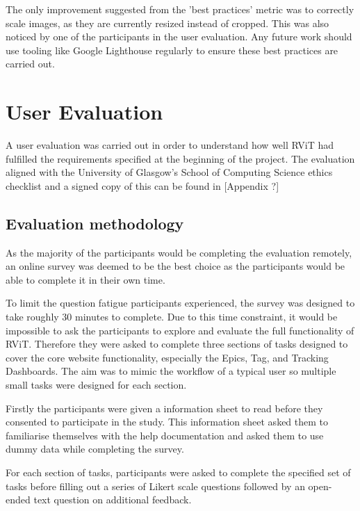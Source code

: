 \documentclass[l4proj.tex]{subfiles}
\begin{document}
The only improvement suggested from the 'best practices' metric was to correctly scale images, as they are currently resized instead of cropped. This was also noticed by one of the participants in the user evaluation. Any future work should use tooling like Google Lighthouse regularly to ensure these best practices are carried out. 


\section{User Evaluation}
A user evaluation was carried out in order to understand how well RViT had fulfilled the requirements specified at the beginning of the project. The evaluation aligned with the University of Glasgow's School of Computing Science ethics checklist and a signed copy of this can be found in [Appendix ?]


\subsection{Evaluation methodology}
As the majority of the participants would be completing the evaluation remotely, an online survey was deemed to be the best choice as the participants would be able to complete it in their own time.

To limit the question fatigue participants experienced, the survey was designed to take roughly 30 minutes to complete. Due to this time constraint, it would be impossible to ask the participants to explore and evaluate the full functionality of RViT. Therefore they were asked to complete three sections of tasks designed to cover the core website functionality, especially the Epics, Tag, and Tracking Dashboards. The aim was to mimic the workflow of a typical user so multiple small tasks were designed for each section.

Firstly the participants were given a information sheet to read before they consented to participate in the study. This information sheet asked them to familiarise themselves with the help documentation and asked them to use dummy data while completing the survey.

For each section of tasks, participants were asked to complete the specified set of tasks before filling out a series of Likert scale questions followed by an open-ended text question on additional feedback.
\end{document}
